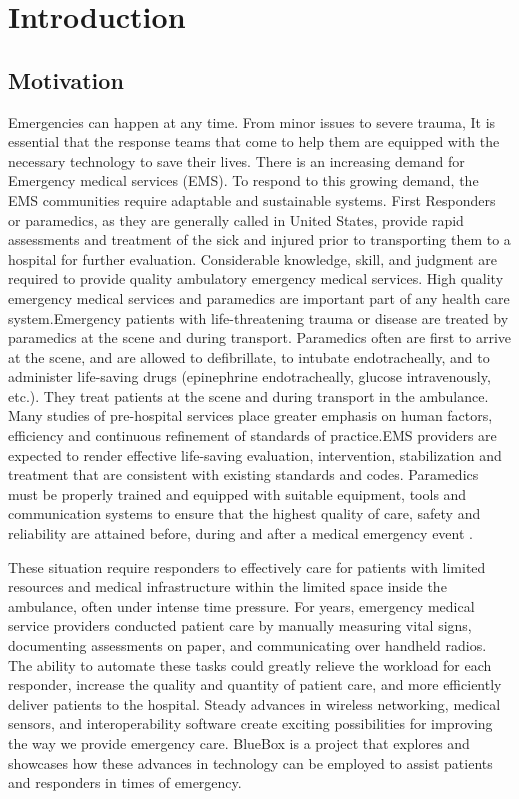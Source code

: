 \chapter{Introduction}
\section{Motivation}
Emergencies can happen at any time. From minor issues to severe trauma, It is essential that the response teams that come to help them are equipped with the necessary technology to save their lives. There is an increasing demand for Emergency medical services (EMS). To respond to this growing demand, the EMS communities require adaptable and sustainable systems. First Responders or paramedics, as they are generally called in United States, provide rapid assessments and treatment of the sick and injured prior to transporting them to a hospital for further evaluation. Considerable knowledge, skill, and judgment are required to provide quality ambulatory emergency medical services. High quality emergency medical services and paramedics are important part of any health care system.Emergency patients with life-threatening trauma or disease are treated by paramedics  at the scene and during transport. Paramedics often are first to arrive at the scene, and  are allowed to defibrillate, to intubate endotracheally, and to administer life-saving drugs (epinephrine endotracheally, glucose intravenously, etc.). They treat patients at the scene and during transport in the ambulance. Many studies of pre-hospital services place greater emphasis on human factors, efficiency and continuous refinement of standards of practice.EMS providers are expected to render effective life-saving evaluation, intervention, stabilization and treatment that are consistent with existing standards and codes. Paramedics must be properly trained and equipped with suitable equipment, tools and communication systems to ensure that the highest quality of care, safety and reliability are attained before, during and after a medical emergency event \cite{EMS,EMS1,EMS2,EMS3}.

These situation require responders to effectively care for patients with limited resources and medical infrastructure within the limited space inside the ambulance, often under intense time pressure. For years, emergency medical service providers conducted patient care by manually measuring vital signs, documenting assessments on paper, and communicating over handheld radios. The ability to automate these tasks could greatly relieve the workload for each responder, increase the quality and quantity of patient care, and more efficiently deliver patients to the hospital. 
Steady advances in wireless networking, medical sensors, and interoperability software create exciting possibilities for improving the way we provide emergency care. BlueBox is a project that explores and showcases how these advances in technology can be employed to assist patients and responders in times of emergency. 

